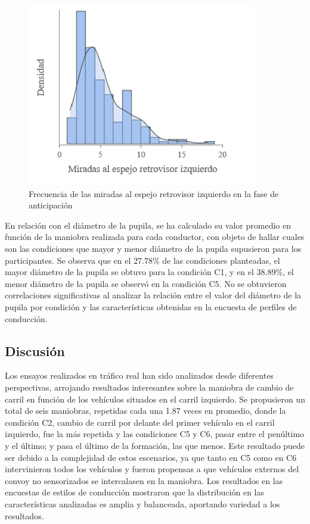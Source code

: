 \newpage
\begin{figure}[h]
    \centering
    \includegraphics[width=10cm]
    {figures/5.8.png}
    \caption{ \label{fig:5.8} Frecuencia de las miradas al espejo retrovisor izquierdo en la fase de anticipación}
\end{figure}

En relación con el diámetro de la pupila, se ha calculado su valor promedio en función de la maniobra realizada para cada conductor, con objeto de hallar cuales son las condiciones que mayor y menor diámetro de la pupila supusieron para los participantes. Se observa que en el 27.78\% de las condiciones planteadas, el mayor diámetro de la pupila se obtuvo para la condición C1, y en el 38.89\%, el menor diámetro de la pupila se observó en la condición C5. No se obtuvieron correlaciones significativas al analizar la relación entre el valor del diámetro de la pupila por condición y las características obtenidas en la encuesta de perfiles de conducción.

\subsection{Discusión }\label{533}

Los ensayos realizados en tráfico real han sido analizados desde diferentes perspectivas, arrojando resultados interesantes sobre la maniobra de cambio de carril en función de los vehículos situados en el carril izquierdo. Se propusieron un total de seis maniobras, repetidas cada una 1.87 veces en promedio, donde la condición C2, cambio de carril por delante del primer vehículo en el carril izquierdo, fue la más repetida y las condiciones C5 y C6, pasar entre el penúltimo y el último; y pasa el último de la formación, las que menos. Este resultado puede ser debido a la complejidad de estos escenarios, ya que tanto en C5 como en C6 intervinieron todos los vehículos y fueron propensas a que vehículos externos del convoy no sensorizados se intercalasen en la maniobra.  Los resultados en las encuestas de estilos de conducción mostraron que la distribución en las características analizadas es amplia y balanceada, aportando variedad a los resultados.

